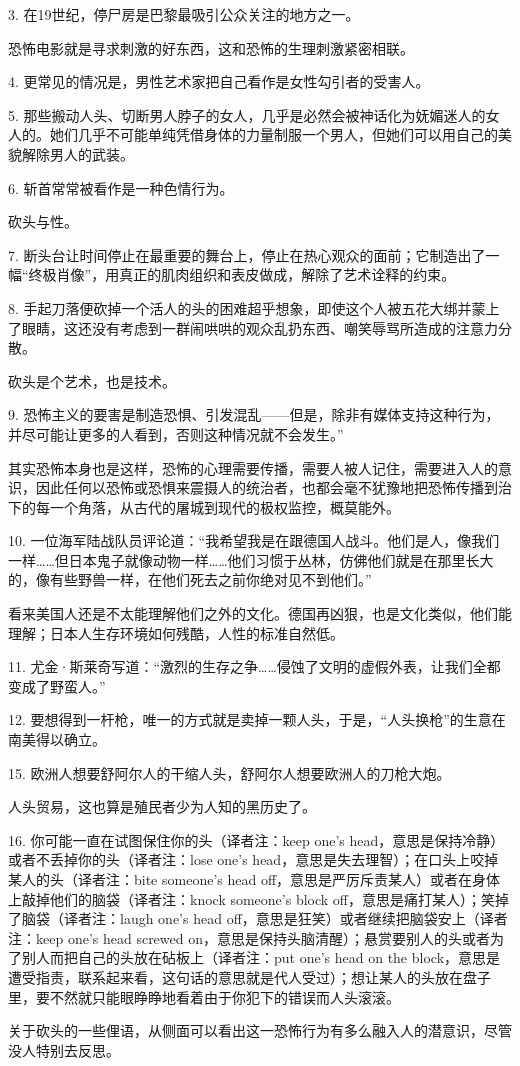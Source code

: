 3. 在19世纪，停尸房是巴黎最吸引公众关注的地方之一。

恐怖电影就是寻求刺激的好东西，这和恐怖的生理刺激紧密相联。

4. 更常见的情况是，男性艺术家把自己看作是女性勾引者的受害人。

5. 那些搬动人头、切断男人脖子的女人，几乎是必然会被神话化为妩媚迷人的女人的。她们几乎不可能单纯凭借身体的力量制服一个男人，但她们可以用自己的美貌解除男人的武装。

6. 斩首常常被看作是一种色情行为。

砍头与性。

7. 断头台让时间停止在最重要的舞台上，停止在热心观众的面前；它制造出了一幅“终极肖像”，用真正的肌肉组织和表皮做成，解除了艺术诠释的约束。

8. 手起刀落便砍掉一个活人的头的困难超乎想象，即使这个人被五花大绑并蒙上了眼睛，这还没有考虑到一群闹哄哄的观众乱扔东西、嘲笑辱骂所造成的注意力分散。

砍头是个艺术，也是技术。

9. 恐怖主义的要害是制造恐惧、引发混乱——但是，除非有媒体支持这种行为，并尽可能让更多的人看到，否则这种情况就不会发生。”

其实恐怖本身也是这样，恐怖的心理需要传播，需要人被人记住，需要进入人的意识，因此任何以恐怖或恐惧来震摄人的统治者，也都会毫不犹豫地把恐怖传播到治下的每一个角落，从古代的屠城到现代的极权监控，概莫能外。

10. 一位海军陆战队员评论道：“我希望我是在跟德国人战斗。他们是人，像我们一样……但日本鬼子就像动物一样……他们习惯于丛林，仿佛他们就是在那里长大的，像有些野兽一样，在他们死去之前你绝对见不到他们。”

看来美国人还是不太能理解他们之外的文化。德国再凶狠，也是文化类似，他们能理解；日本人生存环境如何残酷，人性的标准自然低。

11. 尤金·斯莱奇写道：“激烈的生存之争……侵蚀了文明的虚假外表，让我们全都变成了野蛮人。”

12. 要想得到一杆枪，唯一的方式就是卖掉一颗人头，于是，“人头换枪”的生意在南美得以确立。

15. 欧洲人想要舒阿尔人的干缩人头，舒阿尔人想要欧洲人的刀枪大炮。

人头贸易，这也算是殖民者少为人知的黑历史了。

16. 你可能一直在试图保住你的头（译者注：keep one's head，意思是保持冷静）或者不丢掉你的头（译者注：lose one's head，意思是失去理智）；在口头上咬掉某人的头（译者注：bite someone's head off，意思是严厉斥责某人）或者在身体上敲掉他们的脑袋（译者注：knock someone's block off，意思是痛打某人）；笑掉了脑袋（译者注：laugh one's head off，意思是狂笑）或者继续把脑袋安上（译者注：keep one's head screwed on，意思是保持头脑清醒）；悬赏要别人的头或者为了别人而把自己的头放在砧板上（译者注：put one's head on the block，意思是遭受指责，联系起来看，这句话的意思就是代人受过）；想让某人的头放在盘子里，要不然就只能眼睁睁地看着由于你犯下的错误而人头滚滚。

关于砍头的一些俚语，从侧面可以看出这一恐怖行为有多么融入人的潜意识，尽管没人特别去反思。
